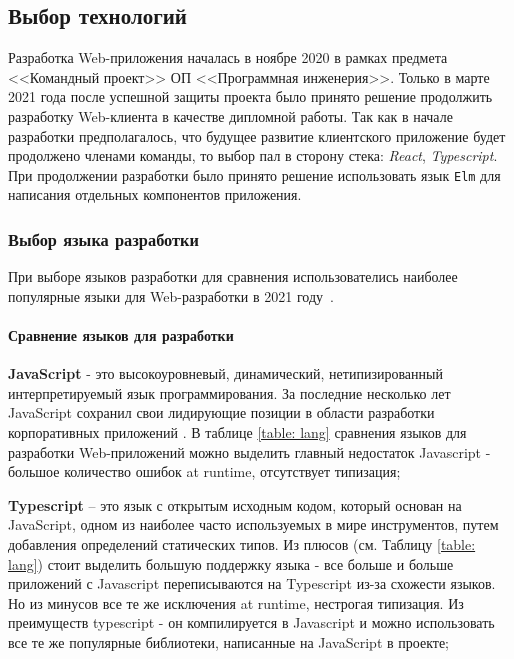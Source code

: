\documentclass[a4paper,12pt,reqno]{article}
\begin{document}
\newpage

\setcounter{section}{3}
\setcounter{subsection}{0}
 \label{sec: 3}


\subsection{Выбор технологий} \label{sec: tech}

Разработка Web-приложения началась в ноябре 2020 в рамках предмета <<Командный проект>> ОП <<Программная инженерия>>. Только в марте 2021 года после успешной защиты проекта было принято решение продолжить разработку Web-клиента в качестве дипломной работы. Так как в начале разработки предполагалось, что будущее развитие клиентского приложение будет продолжено членами команды, то выбор пал в сторону стека:  \textit{React}, \textit{Typescript}. При продолжении разработки было принято решение использовать язык \texttt{Elm} для написания отдельных компонентов приложения. 

\subsubsection{Выбор языка разработки} \label{sec:lang}

При выборе языков разработки для сравнения использователись наиболее популярные языки для Web-разработки в 2021 году~\cite{mostpoplang}.

\paragraph*{Сравнение языков для разработки\\}


\textbf{JavaScript} - это высокоуровневый, динамический, нетипизированный интерпретируемый язык программирования. За последние несколько лет JavaScript сохранил свои лидирующие позиции в области разработки корпоративных приложений \cite{webapp}. В таблице \ref{table: lang} сравнения языков для разработки Web-приложений можно выделить главный недостаток Javascript - большое количество ошибок at runtime, отсутствует типизация;

\textbf{Typescript} -- это язык с открытым исходным кодом, который основан на JavaScript, одном из наиболее часто используемых в мире инструментов, путем добавления определений статических типов. Из плюсов (см. Таблицу \ref{table: lang}) стоит выделить большую поддержку языка - все больше и больше приложений с Javascript переписываются на Typescript из-за схожести языков. Но из минусов все те же исключения at runtime, нестрогая типизация. Из преимуществ typescript - он компилируется в Javascript и можно использовать все те же популярные библиотеки, написанные на JavaScript в проекте; 
\end{document}
